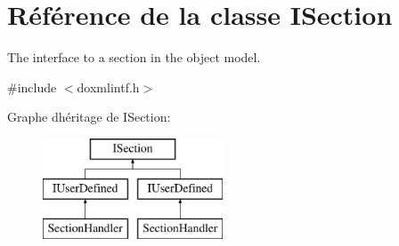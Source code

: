 \hypertarget{class_i_section}{}\section{Référence de la classe I\+Section}
\label{class_i_section}


The interface to a section in the object model.  




{\ttfamily \#include $<$doxmlintf.\+h$>$}

Graphe d\textquotesingle{}héritage de I\+Section\+:\begin{figure}[H]
\begin{center}
\leavevmode
\includegraphics[height=3.000000cm]{class_i_section}
\end{center}
\end{figure}
